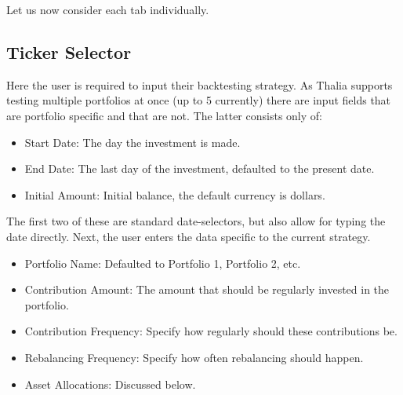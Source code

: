 \documentclass[main.tex]{subfiles}
\begin{document}
Let us now consider each tab individually. 



\subsection*{Ticker Selector}



Here the user is required to input their backtesting strategy. As Thalia supports testing multiple portfolios at once (up to 5 currently) there are input fields that are portfolio specific and that are not. The latter consists only of:



\begin{itemize}

    \item Start Date: The day the investment is made.

    \item End Date: The last day of the investment, defaulted to the present date.

    \item Initial Amount: Initial balance, the default currency is dollars.

\end{itemize}



The first two of these are standard date-selectors, but also allow for typing the date directly. Next, the user enters the data specific to the current strategy.



\begin{itemize}

    \item Portfolio Name: Defaulted to Portfolio 1, Portfolio 2, etc. 

    \item Contribution Amount: The amount that should be regularly invested in the portfolio.

    \item Contribution Frequency: Specify how regularly should these contributions be.

    \item Rebalancing Frequency: Specify how often rebalancing should happen. 

    \item Asset Allocations: Discussed below.

\end{itemize}
\end{document}
